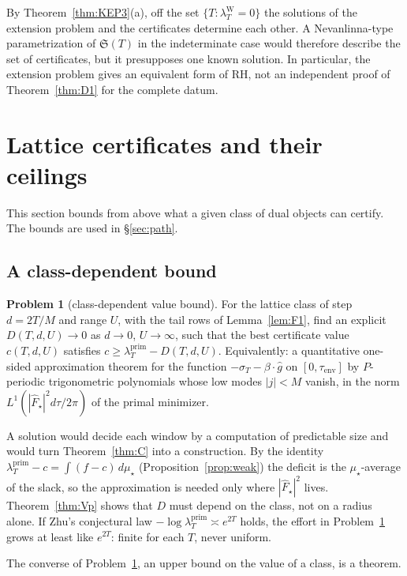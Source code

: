 \documentclass[11pt]{amsart}
\theoremstyle{definition}
\newtheorem{problem}[theorem]{Problem}
\theoremstyle{remark}
\newcommand{\lamP}{\lambda^{\mathrm{prim}}_T}
\newcommand{\lamW}{\lambda^{\mathrm W}_T}
\newcommand{\sT}{\sigma_T}
\newcommand{\Fh}{\widehat F}
\begin{document}
By Theorem~\ref{thm:KEP3}(a), off the set $\{T:\lamW=0\}$ the solutions of the extension problem
and the certificates determine each other. A Nevanlinna-type parametrization of $\mathfrak S(T)$ in
the indeterminate case would therefore describe the set of certificates, but it presupposes one
known solution. In particular, the extension problem gives an equivalent form of RH, not an
independent proof of Theorem~\ref{thm:D1} for the complete datum.


\section{Lattice certificates and their ceilings}\label{sec:class}

This section bounds from above what a given class of dual objects can certify. The bounds are
used in \S\ref{sec:path}.

\subsection{A class-dependent bound}
\begin{problem}[class-dependent value bound]\label{prob:A}
For the lattice class of step $d=2T/M$ and range $U$, with the tail rows of Lemma~\ref{lem:F1},
find an explicit $D(T,d,U)\to0$ as $d\to0$, $U\to\infty$, such that the best certificate value
$c(T,d,U)$ satisfies $c\ge\lamP-D(T,d,U)$. Equivalently: a quantitative one-sided approximation
theorem for the function $-\sT-\beta\cdot\widehat g$ on $[0,\tau_{\mathrm{env}}]$ by $P$-periodic
trigonometric polynomials whose low modes $|j|<M$ vanish, in the norm $L^1(|\Fh_\star|^2d\tau/2\pi)$
of the primal minimizer.
\end{problem}
A solution would decide each window by a computation of predictable size and would turn
Theorem~\ref{thm:C} into a construction. By the identity $\lamP-c=\int(f-c)\,d\mu_\star$
(Proposition~\ref{prop:weak}) the deficit is the $\mu_\star$-average of the slack, so the
approximation is needed only where $|\Fh_\star|^2$ lives. Theorem~\ref{thm:Vp} shows that $D$ must
depend on the class, not on a radius alone. If Zhu's conjectural law $-\log\lamP\asymp e^{2T}$ holds,
the effort in Problem~\ref{prob:A} grows at least like $e^{2T}$: finite for each $T$, never uniform.

The converse of Problem~\ref{prob:A}, an upper bound on the value of a class, is a theorem.
\end{document}
